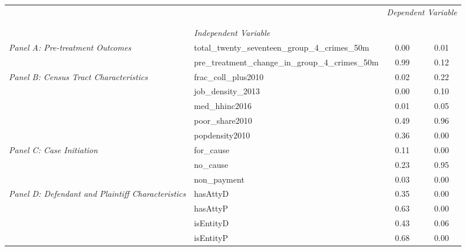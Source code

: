 \begin{tabular}{llcc}
\toprule
 &  & \multicolumn{2}{c}{\textit{Dependent Variable}} \\
\cline{3-4}
\\
 &  &  &  \\
 & \emph{Independent Variable} &  &  \\
\midrule
\multirow[c]{2}{3cm}{\textit{Panel A: Pre-treatment Outcomes}} & total_twenty_seventeen_group_4_crimes_50m & 0.00 & 0.01 \\
 & pre_treatment_change_in_group_4_crimes_50m & 0.99 & 0.12 \\
\cline{1-4}
\multirow[c]{5}{3cm}{\textit{Panel B: Census Tract Characteristics}} & frac_coll_plus2010 & 0.02 & 0.22 \\
 & job_density_2013 & 0.00 & 0.10 \\
 & med_hhinc2016 & 0.01 & 0.05 \\
 & poor_share2010 & 0.49 & 0.96 \\
 & popdensity2010 & 0.36 & 0.00 \\
\cline{1-4}
\multirow[c]{3}{3cm}{\textit{Panel C: Case Initiation}} & for_cause & 0.11 & 0.00 \\
 & no_cause & 0.23 & 0.95 \\
 & non_payment & 0.03 & 0.00 \\
\cline{1-4}
\multirow[c]{4}{3cm}{\textit{Panel D: Defendant and Plaintiff Characteristics}} & hasAttyD & 0.35 & 0.00 \\
 & hasAttyP & 0.63 & 0.00 \\
 & isEntityD & 0.43 & 0.06 \\
 & isEntityP & 0.68 & 0.00 \\
\cline{1-4}
\bottomrule
\end{tabular}
